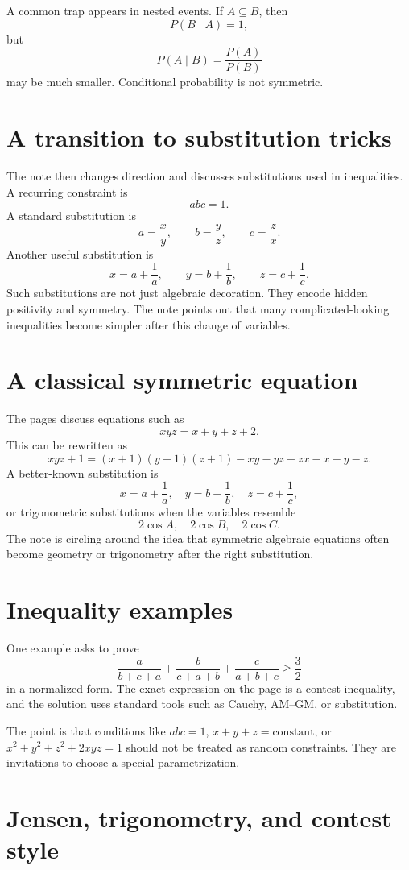 A common trap appears in nested events.  If \(A\subseteq B\), then
\[
  P(B\mid A)=1,
\]
but
\[
  P(A\mid B)=\frac{P(A)}{P(B)}
\]
may be much smaller.  Conditional probability is not symmetric.

\section{A transition to substitution tricks}

The note then changes direction and discusses substitutions used in inequalities.  A recurring constraint is
\[
  abc=1.
\]
A standard substitution is
\[
  a=\frac xy,\qquad b=\frac yz,\qquad c=\frac zx.
\]
Another useful substitution is
\[
  x=a+\frac1a,\qquad y=b+\frac1b,\qquad z=c+\frac1c.
\]
Such substitutions are not just algebraic decoration.  They encode hidden positivity and symmetry.  The note points out that many complicated-looking inequalities become simpler after this change of variables.

\section{A classical symmetric equation}

The pages discuss equations such as
\[
  xyz=x+y+z+2.
\]
This can be rewritten as
\[
  xyz+1=(x+1)(y+1)(z+1)-xy-yz-zx-x-y-z.
\]
A better-known substitution is
\[
  x=a+\frac1a,\quad y=b+\frac1b,\quad z=c+\frac1c,
\]
or trigonometric substitutions when the variables resemble
\[
  2\cos A,\quad 2\cos B,\quad 2\cos C.
\]
The note is circling around the idea that symmetric algebraic equations often become geometry or trigonometry after the right substitution.

\section{Inequality examples}

One example asks to prove
\[
  \frac{a}{b+c+a}+\frac{b}{c+a+b}+\frac{c}{a+b+c}\ge\frac32
\]
in a normalized form.  The exact expression on the page is a contest inequality, and the solution uses standard tools such as Cauchy, AM--GM, or substitution.

The point is that conditions like \(abc=1\), \(x+y+z=\text{constant}\), or \(x^2+y^2+z^2+2xyz=1\) should not be treated as random constraints.  They are invitations to choose a special parametrization.

\section{Jensen, trigonometry, and contest style}

